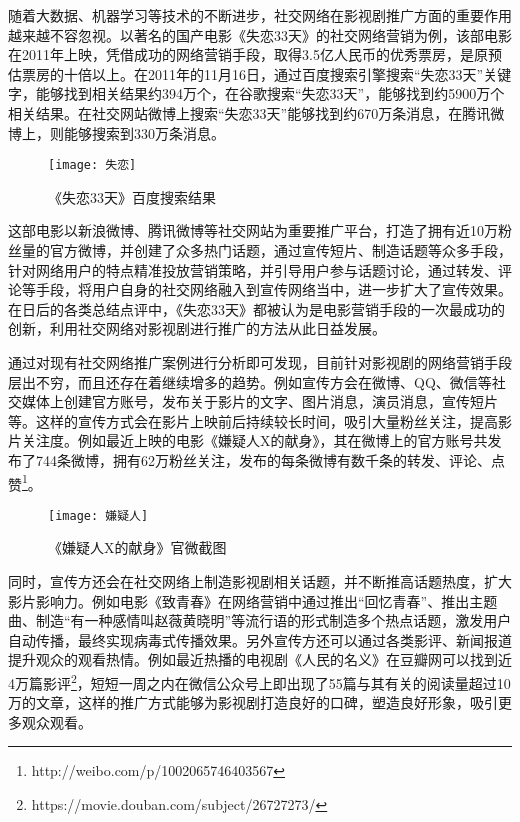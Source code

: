 随着大数据、机器学习等技术的不断进步，社交网络在影视剧推广方面的重要作用越来越不容忽视。以著名的国产电影《失恋33天》的社交网络营销为例，该部电影在2011年上映，凭借成功的网络营销手段，取得3.5亿人民币的优秀票房，是原预估票房的十倍以上\cite{熊莉2012失恋}。在2011年的11月16日，通过百度搜索引擎搜索“失恋33天”关键字，能够找到相关结果约394万个，在谷歌搜索“失恋33天”，能够找到约5900万个相关结果。在社交网站微博上搜索“失恋33天”能够找到约670万条消息，在腾讯微博上，则能够搜索到330万条消息\cite{熊莉2012失恋}。

\begin{figure}[h] 
  \centering
  \texttt{[image: 失恋]}
  \caption{《失恋33天》百度搜索结果}
  \label{失恋}
\end{figure}

这部电影以新浪微博、腾讯微博等社交网站为重要推广平台，打造了拥有近10万粉丝量的官方微博，并创建了众多热门话题，通过宣传短片、制造话题等众多手段，针对网络用户的特点精准投放营销策略，并引导用户参与话题讨论，通过转发、评论等手段，将用户自身的社交网络融入到宣传网络当中，进一步扩大了宣传效果。在日后的各类总结点评中，《失恋33天》都被认为是电影营销手段的一次最成功的创新，利用社交网络对影视剧进行推广的方法从此日益发展。

通过对现有社交网络推广案例进行分析即可发现，目前针对影视剧的网络营销手段层出不穷，而且还存在着继续增多的趋势。例如宣传方会在微博、QQ、微信等社交媒体上创建官方账号，发布关于影片的文字、图片消息，演员消息，宣传短片等。这样的宣传方式会在影片上映前后持续较长时间，吸引大量粉丝关注，提高影片关注度。例如最近上映的电影《嫌疑人X的献身》，其在微博上的官方账号共发布了744条微博，拥有62万粉丝关注，发布的每条微博有数千条的转发、评论、点赞\footnote{http://weibo.com/p/1002065746403567}。

\begin{figure}[h] 
  \centering
  \texttt{[image: 嫌疑人]}
  \caption{《嫌疑人X的献身》官微截图}
\end{figure}

同时，宣传方还会在社交网络上制造影视剧相关话题，并不断推高话题热度，扩大影片影响力。例如电影《致青春》在网络营销中通过推出“回忆青春”、推出主题曲、制造“有一种感情叫赵薇黄晓明”等流行语的形式制造多个热点话题，激发用户自动传播，最终实现病毒式传播效果。另外宣传方还可以通过各类影评、新闻报道提升观众的观看热情。例如最近热播的电视剧《人民的名义》在豆瓣网可以找到近4万篇影评\footnote{https://movie.douban.com/subject/26727273/}，短短一周之内在微信公众号上即出现了55篇与其有关的阅读量超过10万的文章，这样的推广方式能够为影视剧打造良好的口碑，塑造良好形象，吸引更多观众观看。

